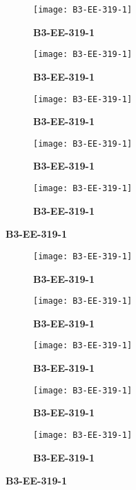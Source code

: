 \documentclass{article}
\begin{document}
	\clearpage
\begin{figure}[]
	\centering
	\begin{subfigure}{0.19\textwidth}
		\centering
		\texttt{[image: B3-EE-319-1]}
		\caption*{\large{\textbf{B3-EE-319-1}}}
	\end{subfigure}\hfil
	\begin{subfigure}{0.19\textwidth}
		\centering
		\texttt{[image: B3-EE-319-1]}
		\caption*{\large{\textbf{B3-EE-319-1}}}
	\end{subfigure}\hfil
	\begin{subfigure}{0.19\textwidth}
		\centering
		\texttt{[image: B3-EE-319-1]}
		\caption*{\large{\textbf{B3-EE-319-1}}}
	\end{subfigure}\hfil
	\begin{subfigure}{0.19\textwidth}
		\centering
		\texttt{[image: B3-EE-319-1]}
		\caption*{\large{\textbf{B3-EE-319-1}}}
	\end{subfigure} \hfil
	\begin{subfigure}{0.19\textwidth}
		\centering
		\texttt{[image: B3-EE-319-1]}
		\caption*{\large{\textbf{B3-EE-319-1}}}
	\end{subfigure}
\end{figure}

\begin{figure}[]
	\centering
	\begin{subfigure}{0.19\textwidth}
		\centering
		\texttt{[image: B3-EE-319-1]}
		\caption*{\large{\textbf{B3-EE-319-1}}}
	\end{subfigure}\hfil
	\begin{subfigure}{0.19\textwidth}
		\centering
		\texttt{[image: B3-EE-319-1]}
		\caption*{\large{\textbf{B3-EE-319-1}}}
	\end{subfigure}\hfil
	\begin{subfigure}{0.19\textwidth}
		\centering
		\texttt{[image: B3-EE-319-1]}
		\caption*{\large{\textbf{B3-EE-319-1}}}
	\end{subfigure}\hfil
	\begin{subfigure}{0.19\textwidth}
		\centering
		\texttt{[image: B3-EE-319-1]}
		\caption*{\large{\textbf{B3-EE-319-1}}}
	\end{subfigure} \hfil
	\begin{subfigure}{0.19\textwidth}
		\centering
		\texttt{[image: B3-EE-319-1]}
		\caption*{\large{\textbf{B3-EE-319-1}}}
	\end{subfigure}
\end{figure}
\end{document}
